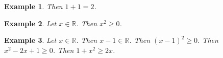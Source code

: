 \documentclass[12pt]{article}
\newtheorem{example}{Example}
\begin{document}
\begin{example}
    Then $1+1=2$.
\end{example}

\begin{example}
    Let $x\in\mathbb{R}$. Then $x^2\ge 0$.
\end{example}

\begin{example}
    Let $x\in\mathbb{R}$. Then $x - 1 \in \mathbb{R}$. Then $(x-1)^2 \geq 0$. Then $x^2 - 2x + 1 \geq 0$. Then $1 + x^2 \geq 2x$.
\end{example}
\end{document}
